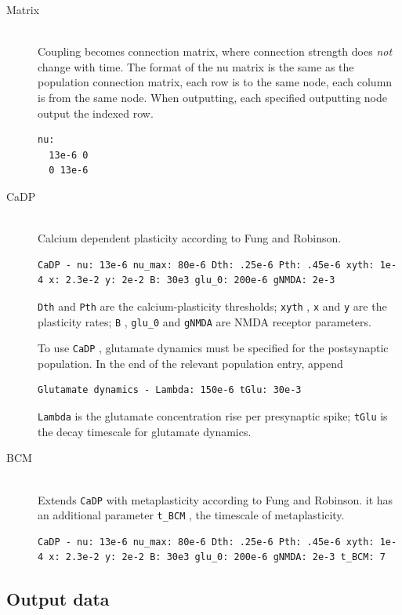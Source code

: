 \documentclass[12pt,a4paper]{article}
\newcommand{\type}[1]{ {\small\small\tt #1} }
\begin{document}
\begin{itemize}
\begin{description}
	\item[Matrix]\ \\
	Coupling becomes connection matrix, where connection strength does \emph{not} change with time. The format of the nu matrix is the same as the population connection matrix, each row is to the same node, each column is from the same node. When outputting, each specified outputting node output the indexed row.
	\begin{lstlisting}
nu:
  13e-6 0
  0 13e-6
	\end{lstlisting}

	\item[CaDP]\ \\
	Calcium dependent plasticity according to Fung and Robinson.
	\begin{lstlisting}
CaDP - nu: 13e-6 nu_max: 80e-6 Dth: .25e-6 Pth: .45e-6 xyth: 1e-4 x: 2.3e-2 y: 2e-2 B: 30e3 glu_0: 200e-6 gNMDA: 2e-3
	\end{lstlisting}

	\type{Dth} and \type{Pth} are the calcium-plasticity thresholds; \type{xyth}, \type{x} and \type{y} are the plasticity rates; \type{B}, \type{glu\_0} and \type{gNMDA} are NMDA receptor parameters.

	To use \type{CaDP}, glutamate dynamics must be specified for the postsynaptic population. In the end of the relevant population entry, append
	\begin{lstlisting}
Glutamate dynamics - Lambda: 150e-6 tGlu: 30e-3
	\end{lstlisting}
	\type{Lambda} is the glutamate concentration rise per presynaptic spike; \type{tGlu} is the decay timescale for glutamate dynamics.

	\item[BCM]\ \\
	Extends \type{CaDP} with metaplasticity according to Fung and Robinson. it has an additional parameter \type{t\_BCM}, the timescale of metaplasticity.
	\begin{lstlisting}
CaDP - nu: 13e-6 nu_max: 80e-6 Dth: .25e-6 Pth: .45e-6 xyth: 1e-4 x: 2.3e-2 y: 2e-2 B: 30e3 glu_0: 200e-6 gNMDA: 2e-3 t_BCM: 7
	\end{lstlisting}

\end{description}
\end{itemize}

\subsection{Output data}
\label{sec:output}
\end{document}
